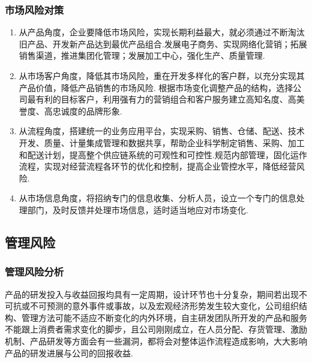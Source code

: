 \subsubsection{市场风险对策}
\begin{enumerate}
\item 从产品角度，企业要降低市场风险，实现长期利益最大，就必须通过不断淘汰旧产品、开发新产品达到最优产品组合.发展电子商务、实现网络化营销；拓展销售渠道，推进集团化管理；发展加工中心，强化生产、质量管理.

\item 从市场客户角度，降低其市场风险，重在开发多样化的客户群，以充分实现其产品价值，降低产品销售的市场风险. 根据市场变化调整产品的结构，选择公司最有利的目标客户，利用强有力的营销组合和客户服务建立高知名度、高美誉度、高忠诚度的品牌形象.

\item 从流程角度，搭建统一的业务应用平台，实现采购、销售、仓储、配送、技术开发、质量、计量集成管理和数据共享，帮助企业科学制定销售、采购、加工和配送计划，提高整个供应链系统的可观性和可控性.规范内部管理，固化运作流程，实现对经营流程各环节的优化和控制，提高企业管控水平，降低经营风险.

\item 从市场信息角度，将招纳专门的信息收集、分析人员，设立一个专门的信息处理部门，及时反馈并处理市场信息，适时适当地应对市场变化.
\end{enumerate}

\subsection{管理风险}
\subsubsection{管理风险分析}
产品的研发投入与收益回报均具有一定周期，设计环节也十分复杂，期间若出现不可抗或不可预测的意外事件或事故，以及宏观经济形势发生较大变化，公司组织结构、管理方法可能不适应不断变化的内外环境，自主研发团队所开发的产品和服务不能跟上消费者需求变化的脚步，且公司刚刚成立，在人员分配、存货管理、激励机制、产品研发等方面会有一些漏洞，都将会对整体运作流程造成影响，大大影响产品的研发进展与公司的回报收益.

